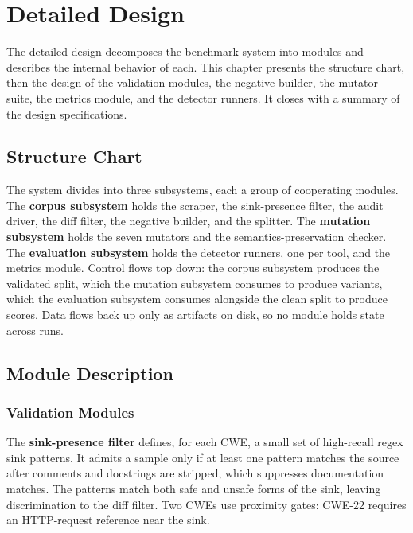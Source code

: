 \chapter{Detailed Design}
\label{ch:detailed}

The detailed design decomposes the benchmark system into modules and describes
the internal behavior of each. This chapter presents the structure chart, then
the design of the validation modules, the negative builder, the mutator suite,
the metrics module, and the detector runners. It closes with a summary of the
design specifications.


\section{Structure Chart}

The system divides into three subsystems, each a group of cooperating modules.
The \textbf{corpus subsystem} holds the scraper, the sink-presence filter, the
audit driver, the diff filter, the negative builder, and the splitter. The
\textbf{mutation subsystem} holds the seven mutators and the
semantics-preservation checker. The \textbf{evaluation subsystem} holds the
detector runners, one per tool, and the metrics module. Control flows top down:
the corpus subsystem produces the validated split, which the mutation subsystem
consumes to produce variants, which the evaluation subsystem consumes alongside
the clean split to produce scores. Data flows back up only as artifacts on
disk, so no module holds state across runs.

\section{Module Description}

\subsection{Validation Modules}

The \textbf{sink-presence filter} defines, for each CWE, a small set of
high-recall regex sink patterns. It admits a sample only if at least one pattern
matches the source after comments and docstrings are stripped, which suppresses
documentation matches. The patterns match both safe and unsafe forms of the
sink, leaving discrimination to the diff filter. Two CWEs use proximity gates:
CWE-22 requires an HTTP-request reference near the sink.


